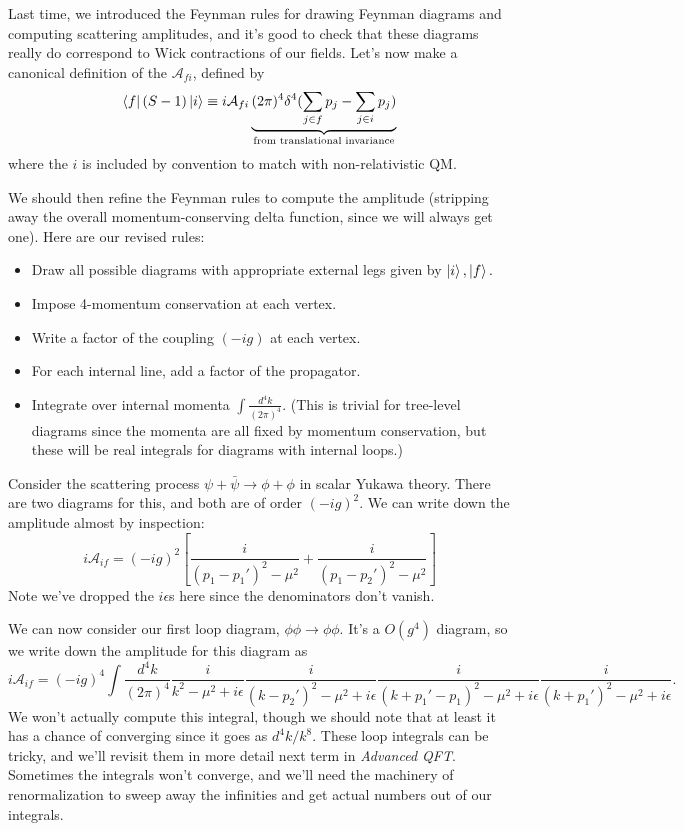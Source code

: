 Last time, we introduced the Feynman rules for drawing Feynman diagrams and computing scattering amplitudes, and it's good to check that these diagrams really do correspond to Wick contractions of our fields. Let's now make a canonical definition of the  $\mathcal{A}_{fi}$, defined by
$$\left< f \right|(S-1)\left| i \right>\equiv i\mathcal{A}_{fi} \underbrace{(2\pi)^4 \delta^4(\sum_{j\in f} p_j - \sum_{j\in i} p_j)}_{\text{from translational invariance}}$$
where the $i$ is included by convention to match with non-relativistic QM.

We should then refine the Feynman rules to compute the amplitude (stripping away the overall momentum-conserving delta function, since we will always get one). Here are our revised rules:
\begin{itemize}
    \item Draw all possible diagrams with appropriate external legs given by $\left| i \right>,\left| f \right>.$
    \item Impose 4-momentum conservation at each vertex.
    \item Write a factor of the coupling $(-ig)$ at each vertex.
    \item For each internal line, add a factor of the propagator.
    \item Integrate over internal momenta $\int \frac{d^4k}{(2\pi)^4}.$ (This is trivial for tree-level diagrams since the momenta are all fixed by momentum conservation, but these will be real integrals for diagrams with internal loops.)
\end{itemize}

\begin{exm}%
Consider the scattering process $\psi+\bar \psi \to \phi+\phi$ in scalar Yukawa theory. There are two diagrams for this, and both are of order $(-ig)^2$. We can write down the amplitude almost by inspection:
$$i\mathcal{A}_{if}=(-ig)^2\left[\frac{i}{(p_1-p_1')^2-\mu^2}+\frac{i}{(p_1-p_2')^2-\mu^2}\right]$$
Note we've dropped the $i\epsilon$s here since the denominators don't vanish.
\end{exm}

\begin{exm}%
We can now consider our first loop diagram, $\phi\phi \to \phi\phi.$ It's a $O(g^4)$ diagram, so we write down the amplitude for this diagram as
$$i\mathcal{A}_{if}=(-ig)^4 \int \frac{d^4k}{(2\pi)^4}\frac{i}{k^2-\mu^2+i\epsilon} \frac{i}{(k-p_2')^2-\mu^2 +i\epsilon}\frac{i}{(k+p_1'-p_1)^2-\mu^2+i\epsilon}\frac{i}{(k+p_1')^2-\mu^2+i\epsilon}.$$
We won't actually compute this integral, though we should note that at least it has a chance of converging since it goes as $d^4k/k^8$. These loop integrals can be tricky, and we'll revisit them in more detail next term in \emph{Advanced QFT}. Sometimes the integrals won't converge, and we'll need the machinery of renormalization to sweep away the infinities and get actual numbers out of our integrals.
\end{exm}

